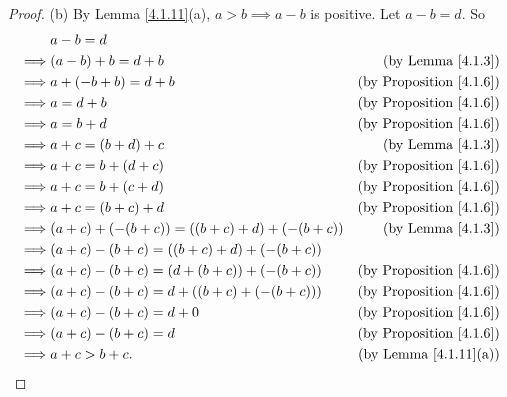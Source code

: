 \begin{proof}{(b)}
    By Lemma \ref{4.1.11}(a), \(a > b \implies a - b\) is positive.
    Let \(a - b = d\).
    So
    \begin{align*}
                 & a - b = d                                                                               \\
        \implies & (a - b) + b = d + b                               & \text{(by Lemma \ref{4.1.3})}       \\
        \implies & a + (-b + b) = d + b                              & \text{(by Proposition \ref{4.1.6})} \\
        \implies & a = d + b                                         & \text{(by Proposition \ref{4.1.6})} \\
        \implies & a = b + d                                         & \text{(by Proposition \ref{4.1.6})} \\
        \implies & a + c = (b + d) + c                               & \text{(by Lemma \ref{4.1.3})}       \\
        \implies & a + c = b + (d + c)                               & \text{(by Proposition \ref{4.1.6})} \\
        \implies & a + c = b + (c + d)                               & \text{(by Proposition \ref{4.1.6})} \\
        \implies & a + c = (b + c) + d                               & \text{(by Proposition \ref{4.1.6})} \\
        \implies & (a + c) + (-(b + c)) = ((b + c) + d) + (-(b + c)) & \text{(by Lemma \ref{4.1.3})}       \\
        \implies & (a + c) - (b + c) = ((b + c) + d) + (-(b + c))                                          \\
        \implies & (a + c) - (b + c) = (d + (b + c)) + (-(b + c))    & \text{(by Proposition \ref{4.1.6})} \\
        \implies & (a + c) - (b + c) = d + ((b + c) + (-(b + c)))    & \text{(by Proposition \ref{4.1.6})} \\
        \implies & (a + c) - (b + c) = d + 0                         & \text{(by Proposition \ref{4.1.6})} \\
        \implies & (a + c) - (b + c) = d                             & \text{(by Proposition \ref{4.1.6})} \\
        \implies & a + c > b + c.                                    & \text{(by Lemma \ref{4.1.11}(a))}   \\
    \end{align*}
\end{proof}

